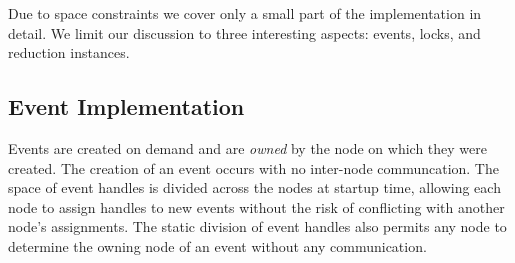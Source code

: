 Due to space constraints we cover only a small part of the implementation in detail.
We limit our discussion to three interesting aspects:
events, locks, and reduction instances.

\subsection{Event Implementation}
\label{subsec:eventimpl}

Events are created on demand and are {\em owned} by the node on which they
were created.  The creation of an event occurs with no inter-node communcation.
The space of event
handles is divided across the nodes at startup time, allowing each node to assign handles
to new events without the risk of conflicting with another node's assignments.  The static division
of event handles also permits any node to determine the owning node of an event
without any communication.

